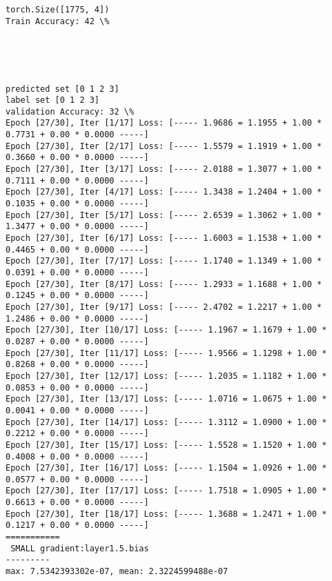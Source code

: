 \documentclass[11pt]{article}
\begin{document}
    \begin{Verbatim}[commandchars=\\\{\}]
torch.Size([1775, 4])
Train Accuracy: 42 \%

    \end{Verbatim}

    \begin{center}
    \end{center}
    { \hspace*{\fill} \\}
    
    \begin{center}
    \end{center}
    { \hspace*{\fill} \\}
    
    \begin{Verbatim}[commandchars=\\\{\}]
predicted set [0 1 2 3]
label set [0 1 2 3]
validation Accuracy: 32 \%
Epoch [27/30], Iter [1/17] Loss: [----- 1.9686 = 1.1955 + 1.00 * 0.7731 + 0.00 * 0.0000 -----]
Epoch [27/30], Iter [2/17] Loss: [----- 1.5579 = 1.1919 + 1.00 * 0.3660 + 0.00 * 0.0000 -----]
Epoch [27/30], Iter [3/17] Loss: [----- 2.0188 = 1.3077 + 1.00 * 0.7111 + 0.00 * 0.0000 -----]
Epoch [27/30], Iter [4/17] Loss: [----- 1.3438 = 1.2404 + 1.00 * 0.1035 + 0.00 * 0.0000 -----]
Epoch [27/30], Iter [5/17] Loss: [----- 2.6539 = 1.3062 + 1.00 * 1.3477 + 0.00 * 0.0000 -----]
Epoch [27/30], Iter [6/17] Loss: [----- 1.6003 = 1.1538 + 1.00 * 0.4465 + 0.00 * 0.0000 -----]
Epoch [27/30], Iter [7/17] Loss: [----- 1.1740 = 1.1349 + 1.00 * 0.0391 + 0.00 * 0.0000 -----]
Epoch [27/30], Iter [8/17] Loss: [----- 1.2933 = 1.1688 + 1.00 * 0.1245 + 0.00 * 0.0000 -----]
Epoch [27/30], Iter [9/17] Loss: [----- 2.4702 = 1.2217 + 1.00 * 1.2486 + 0.00 * 0.0000 -----]
Epoch [27/30], Iter [10/17] Loss: [----- 1.1967 = 1.1679 + 1.00 * 0.0287 + 0.00 * 0.0000 -----]
Epoch [27/30], Iter [11/17] Loss: [----- 1.9566 = 1.1298 + 1.00 * 0.8268 + 0.00 * 0.0000 -----]
Epoch [27/30], Iter [12/17] Loss: [----- 1.2035 = 1.1182 + 1.00 * 0.0853 + 0.00 * 0.0000 -----]
Epoch [27/30], Iter [13/17] Loss: [----- 1.0716 = 1.0675 + 1.00 * 0.0041 + 0.00 * 0.0000 -----]
Epoch [27/30], Iter [14/17] Loss: [----- 1.3112 = 1.0900 + 1.00 * 0.2212 + 0.00 * 0.0000 -----]
Epoch [27/30], Iter [15/17] Loss: [----- 1.5528 = 1.1520 + 1.00 * 0.4008 + 0.00 * 0.0000 -----]
Epoch [27/30], Iter [16/17] Loss: [----- 1.1504 = 1.0926 + 1.00 * 0.0577 + 0.00 * 0.0000 -----]
Epoch [27/30], Iter [17/17] Loss: [----- 1.7518 = 1.0905 + 1.00 * 0.6613 + 0.00 * 0.0000 -----]
Epoch [27/30], Iter [18/17] Loss: [----- 1.3688 = 1.2471 + 1.00 * 0.1217 + 0.00 * 0.0000 -----]
===========
 SMALL gradient:layer1.5.bias
---------
max: 7.5342393302e-07, mean: 2.3224599488e-07

    \end{Verbatim}
\end{document}
